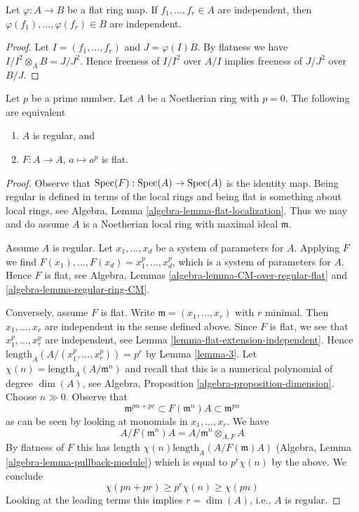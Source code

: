 \begin{lemma}
\label{lemma-flat-extension-independent}
Let $\varphi : A \to B$ be a flat ring map.
If $f_1, \ldots, f_r \in A$ are independent, then
$\varphi(f_1), \ldots, \varphi(f_r) \in B$ are independent.
\end{lemma}

\begin{proof}
Let $I = (f_1, \ldots, f_r)$ and $J = \varphi(I)B$. By flatness we have
$I/I^2 \otimes_A B = J/J^2$. Hence freeness of $I/I^2$ over $A/I$
implies freeness of $J/J^2$ over $B/J$.
\end{proof}

\begin{lemma}[Kunz]
\label{lemma-frobenius-flat-regular}
\begin{reference}
\cite{Kunz-flat}
\end{reference}
Let $p$ be a prime number.
Let $A$ be a Noetherian ring with $p = 0$.
The following are equivalent
\begin{enumerate}
\item $A$ is regular, and
\item $F : A \to A$, $a \mapsto a^p$ is flat.
\end{enumerate}
\end{lemma}

\begin{proof}
Observe that $\mathop{\mathrm{Spec}}(F) : \mathop{\mathrm{Spec}}(A) \to \mathop{\mathrm{Spec}}(A)$ is the identity map.
Being regular is defined in terms of the local rings and being flat
is something about local rings, see
Algebra, Lemma \ref{algebra-lemma-flat-localization}.
Thus we may and do assume $A$ is a Noetherian
local ring with maximal ideal $\mathfrak m$.

\medskip\noindent
Assume $A$ is regular. Let $x_1, \ldots, x_d$ be a
system of parameters for $A$. Applying $F$ we find
$F(x_1), \ldots, F(x_d) = x_1^p, \ldots, x_d^p$,
which is a system of parameters for $A$. Hence $F$ is flat, see
Algebra, Lemmas \ref{algebra-lemma-CM-over-regular-flat} and
\ref{algebra-lemma-regular-ring-CM}.

\medskip\noindent
Conversely, assume $F$ is flat. Write $\mathfrak m = (x_1, \ldots, x_r)$
with $r$ minimal. Then $x_1, \ldots, x_r$ are independent in the sense
defined above. Since $F$ is flat, we see that $x_1^p, \ldots, x_r^p$
are independent, see Lemma \ref{lemma-flat-extension-independent}.
Hence $\text{length}_A(A/(x_1^p, \ldots, x_r^p)) = p^r$ by
Lemma \ref{lemma-3}.
Let $\chi(n) = \text{length}_A(A/\mathfrak m^n)$ and recall
that this is a numerical polynomial of degree $\dim(A)$, see
Algebra, Proposition \ref{algebra-proposition-dimension}.
Choose $n \gg 0$. Observe that
$$
\mathfrak m^{pn + pr} \subset F(\mathfrak m^n)A \subset \mathfrak m^{pn}
$$
as can be seen by looking at monomials in $x_1, \ldots, x_r$. We have
$$
A/F(\mathfrak m^n)A = A/\mathfrak m^n \otimes_{A, F} A
$$
By flatness of $F$ this has length $\chi(n) \text{length}_A(A/F(\mathfrak m)A)$
(Algebra, Lemma \ref{algebra-lemma-pullback-module})
which is equal to $p^r\chi(n)$ by the above. We conclude
$$
\chi(pn + pr) \geq p^r\chi(n) \geq \chi(pn)
$$
Looking at the leading terms this implies $r = \dim(A)$, i.e., $A$ is regular.
\end{proof}




